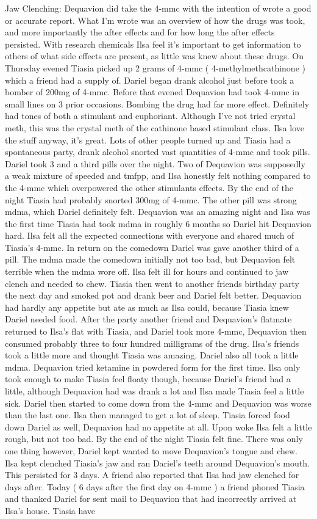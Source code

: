 \documentclass[12pt]{book}
\begin{document}
Jaw Clenching: Dequavion did take the 4-mmc with the intention of wrote a good or accurate report. What I'm wrote was an overview of how the drugs was took, and more importantly the after effects and for how long the after effects persisted. With research chemicals Ilsa feel it's important to get information to others of what side effects are present, as little was knew about these drugs. On Thursday evened Tiasia picked up 2 grams of 4-mmc ( 4-methylmethcathinone ) which a friend had a supply of. Dariel began drank alcohol just before took a bomber of 200mg of 4-mmc. Before that evened Dequavion had took 4-mmc in small lines on 3 prior occasions. Bombing the drug had far more effect. Definitely had tones of both a stimulant and euphoriant. Although I've not tried crystal meth, this was the crystal meth of the cathinone based stimulant class. Ilsa love the stuff anyway, it's great. Lots of other people turned up and Tiasia had a spontaneous party, drank alcohol snorted vast quantities of 4-mmc and took pills. Dariel took 3 and a third pills over the night. Two of Dequavion was supposedly a weak mixture of speeded and tmfpp, and Ilsa honestly felt nothing compared to the 4-mmc which overpowered the other stimulants effects. By the end of the night Tiasia had probably snorted 300mg of 4-mmc. The other pill was strong mdma, which Dariel definitely felt. Dequavion was an amazing night and Ilsa was the first time Tiasia had took mdma in roughly 6 months so Dariel hit Dequavion hard. Ilsa felt all the expected connections with everyone and shared much of Tiasia's 4-mmc. In return on the comedown Dariel was gave another third of a pill. The mdma made the comedown initially not too bad, but Dequavion felt terrible when the mdma wore off. Ilsa felt ill for hours and continued to jaw clench and needed to chew. Tiasia then went to another friends birthday party the next day and smoked pot and drank beer and Dariel felt better. Dequavion had hardly any appetite but ate as much as Ilsa could, because Tiasia knew Dariel needed food. After the party another friend and Dequavion's flatmate returned to Ilsa's flat with Tiasia, and Dariel took more 4-mmc, Dequavion then consumed probably three to four hundred milligrams of the drug. Ilsa's friends took a little more and thought Tiasia was amazing. Dariel also all took a little mdma. Dequavion tried ketamine in powdered form for the first time. Ilsa only took enough to make Tiasia feel floaty though, because Dariel's friend had a little, although Dequavion had was drank a lot and Ilsa made Tiasia feel a little sick. Dariel then started to come down from the 4-mmc and Dequavion was worse than the last one. Ilsa then managed to get a lot of sleep. Tiasia forced food down Dariel as well, Dequavion had no appetite at all. Upon woke Ilsa felt a little rough, but not too bad. By the end of the night Tiasia felt fine. There was only one thing however, Dariel kept wanted to move Dequavion's tongue and chew. Ilsa kept clenched Tiasia's jaw and ran Dariel's teeth around Dequavion's mouth. This persisted for 3 days. A friend also reported that Ilsa had jaw clenched for days after. Today ( 6 days after the first day on 4-mmc ) a friend phoned Tiasia and thanked Dariel for sent mail to Dequavion that had incorrectly arrived at Ilsa's house. Tiasia have 
\end{document}
